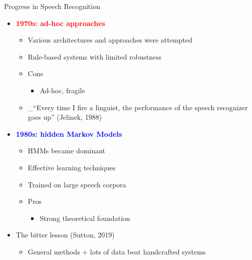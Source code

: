 \documentclass[
  10pt,
  ignorenonframetext,
]{beamer}
\providecommand{\tightlist}{%
  \setlength{\itemsep}{0pt}\setlength{\parskip}{0pt}}
\begin{document}
\begin{frame}{Progress in Speech Recognition}
\label{progress-in-speech-recognition}
\begin{itemize}
\tightlist
\item
  \textbf{\textcolor{red}{1970s: ad-hoc approaches}}

  \begin{itemize}
  \tightlist
  \item
    Various architectures and approaches were attempted
  \item
    Rule-based systems with limited robustness
  \item
    Cons

    \begin{itemize}
    \tightlist
    \item
      Ad-hoc, fragile
    \end{itemize}
  \item
    \_``Every time I fire a linguist, the performance of the speech
    recognizer goes up'' (Jelinek, 1988)
  \end{itemize}
\item
  \textbf{\textcolor{blue}{1980s: hidden Markov Models}}

  \begin{itemize}
  \tightlist
  \item
    HMMs became dominant
  \item
    Effective learning techniques
  \item
    Trained on large speech corpora
  \item
    Pros

    \begin{itemize}
    \tightlist
    \item
      Strong theoretical foundation
    \end{itemize}
  \end{itemize}
\item
  The bitter lesson (Sutton, 2019)

  \begin{itemize}
  \tightlist
  \item
    General methods + lots of data beat handcrafted systems
  \end{itemize}
\end{itemize}
\end{frame}
\end{document}

